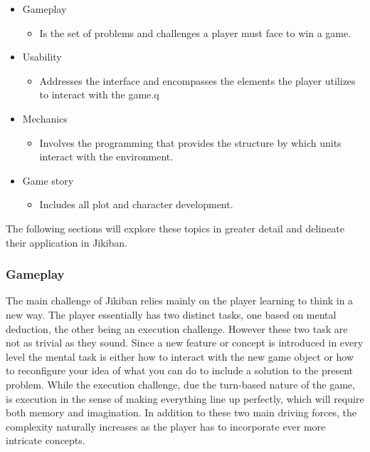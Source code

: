 \begin{itemize}

\item Gameplay
\begin{itemize}
\item Is the set of problems and challenges a player must face to win a game.
\end{itemize}

\item Usability
\begin{itemize}
\item Addresses the interface and encompasses the elements the player
  utilizes to interact with the game.q
\end{itemize}

\item Mechanics
\begin{itemize}
\item Involves the programming that provides the structure by which
  units interact with the environment.
\end{itemize}

\item Game story
\begin{itemize}
\item Includes all plot and character development.
\end{itemize}
\end{itemize}

The following sections will explore these topics in greater detail and
delineate their application in Jikiban.

\subsubsection{Gameplay}
The main challenge of Jikiban relies mainly on the player learning to
think in a new way. The player essentially has two distinct tasks, one
based on mental deduction, the other being an execution challenge.
However these two task are not as trivial as they sound. Since a new
feature or concept is introduced in every level the mental task is
either how to interact with the new game object or how to reconfigure
your idea of what you can do to include a solution to the present
problem. While the execution challenge, due the turn-based nature of
the game, is execution in the sense of making everything line up
perfectly, which will require both memory and imagination. In addition
to these two main driving forces, the complexity naturally increases
as the player has to incorporate ever more intricate concepts.

